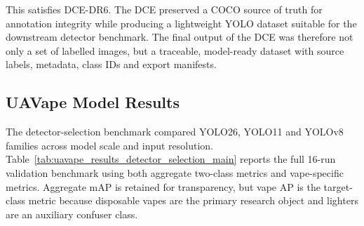 This satisfies DCE-DR6. The DCE preserved a COCO source of truth for annotation integrity while producing a lightweight YOLO dataset suitable for the downstream detector benchmark. The final output of the DCE was therefore not only a set of labelled images, but a traceable, model-ready dataset with source labels, metadata, class IDs and export manifests.

\subsection{UAVape Model Results}

The detector-selection benchmark compared YOLO26, YOLO11 and YOLOv8 families across model scale and input resolution. Table~\ref{tab:uavape_results_detector_selection_main} reports the full 16-run validation benchmark using both aggregate two-class metrics and vape-specific metrics. Aggregate mAP is retained for transparency, but vape AP is the target-class metric because disposable vapes are the primary research object and lighters are an auxiliary confuser class.

